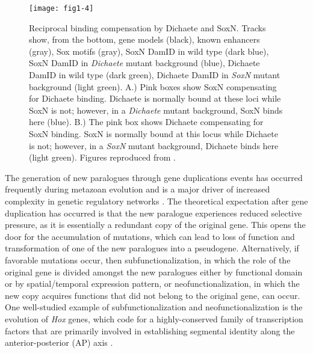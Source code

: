 \begin{figure}
\centering
\texttt{[image: fig1-4]}
\caption{Reciprocal binding compensation by Dichaete and SoxN. Tracks show, from the bottom, gene models (black), known enhancers (gray), Sox motifs (gray), SoxN DamID in wild type (dark blue), SoxN DamID in \emph{Dichaete} mutant background (blue), Dichaete DamID in wild type (dark green), Dichaete DamID in \emph{SoxN} mutant background (light green). A.) Pink boxes show SoxN compensating for Dichaete binding. Dichaete is normally bound at these loci while SoxN is not; however, in a \emph{Dichaete} mutant background, SoxN binds here (blue). B.) The pink box shows Dichaete compensating for SoxN binding. SoxN is normally bound at this locus while Dichaete is not; however, in a \emph{SoxN} mutant background, Dichaete binds here (light green). Figures reproduced from \citet{ferrero_soxneuro_2014}.}
\label{Figure 1.4}
\end{figure}

The generation of new paralogues through gene duplications events has occurred frequently during metazoan evolution and is a major driver of increased complexity in genetic regulatory networks \citep{larroux_genesis_2008}. The theoretical expectation after gene duplication has occurred is that the new paralogue experiences reduced selective pressure, as it is essentially a redundant copy of the original gene. This opens the door for the accumulation of mutations, which can lead to loss of function and transformation of one of the new paralogues into a pseudogene. Alternatively, if favorable mutations occur, then subfunctionalization, in which the role of the original gene is divided amongst the new paralogues either by functional domain or by spatial/temporal expression pattern, or neofunctionalization, in which the new copy acquires functions that did not belong to the original gene, can occur\citep{force_preservation_1999,lynch_evolutionary_2000}. One well-studied example of subfunctionalization and neofunctionalization is the evolution of \emph{Hox} genes, which code for a highly-conserved family of transcription factors that are primarily involved in establishing segmental identity along the anterior-posterior (AP) axis \citep{kappen_evolution_1993}.\\ 

